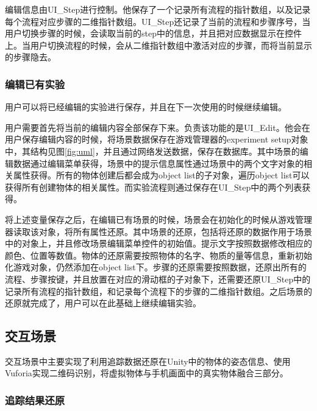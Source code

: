编辑信息由UI\_Step进行控制。他保存了一个记录所有流程的指针数组，以及记录每个流程对应步骤的二维指针数组。UI\_Step还记录了当前的流程和步骤序号，当用户切换步骤的时候，会读取当前的step中的信息，并且把对应数据显示在控件上。当用户切换流程的时候，会从二维指针数组中激活对应的步骤，而将当前显示的步骤隐去。


\subsubsection{编辑已有实验}
用户可以将已经编辑的实验进行保存，并且在下一次使用的时候继续编辑。

用户需要首先将当前的编辑内容全部保存下来。负责该功能的是UI\_Edit。他会在用户保存编辑内容的时候，将场景数据保存在游戏管理器的experiment setup对象中，其结构见图\ref{fig:uml}，并且通过网络发送数据，保存在数据库。其中场景的编辑数据通过编辑菜单获得，场景中的提示信息属性通过场景中的两个文字对象的相关属性获得。所有的物体创建后都会成为object list的子对象，遍历object list可以获得所有创建物体的相关属性。而实验流程则通过保存在UI\_Step中的两个列表获得。

将上述变量保存之后，在编辑已有场景的时候，场景会在初始化的时候从游戏管理器读取该对象，将所有属性还原。其中场景的还原，包括将还原的数据作用于场景中的对象上，并且修改场景编辑菜单控件的初始值。提示文字按照数据修改相应的颜色、位置等数值。物体的还原需要按照物体的名字、物质的量等信息，重新初始化游戏对象，仍然添加在object list下。步骤的还原需要按照数据，还原出所有的流程、步骤按键，并且放置在对应的滑动框的子对象下，还需要还原UI\_Step中的记录所有流程的指针数组，和记录每个流程下的步骤的二维指针数组。之后场景的还原就完成了，用户可以在此基础上继续编辑实验。

\subsection{交互场景}
交互场景中主要实现了利用追踪数据还原在Unity中的物体的姿态信息、使用Vuforia实现二维码识别，将虚拟物体与手机画面中的真实物体融合三部分。

\subsubsection{追踪结果还原}

